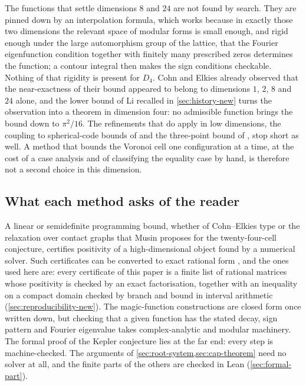 \documentclass[11pt,reqno]{amsart}
\renewcommand{\_}{\origunderscore\allowbreak}
\numberwithin{equation}{section}
\theoremstyle{plain}
\theoremstyle{definition}
\theoremstyle{remark}
\begin{document}
The functions that settle dimensions $8$ and $24$ are not found by search.
They are pinned down by an interpolation formula, which works because in
exactly those two dimensions the relevant space of modular forms is small
enough, and rigid enough under the large automorphism group of the lattice,
that the Fourier eigenfunction condition together with finitely many
prescribed zeros determines the function; a contour integral then makes the
sign conditions checkable. Nothing of that rigidity is present for $D_4$.
Cohn and Elkies \cite{CE03} already observed that the near-exactness of
their bound appeared to belong to dimensions $1$, $2$, $8$ and $24$ alone,
and the lower bound of Li recalled in \cref{sec:history-new} turns the
observation into a theorem in dimension four: no admissible function
brings the bound down to $\pi^2/16$. The refinements that do apply in low
dimensions, the coupling to spherical-code bounds of \cite{CZ14} and the
three-point bound of \cite{CdLS22}, stop short as well. A method that
bounds the Voronoi cell one configuration at a time, at the cost of a case
analysis and of classifying the equality case by hand, is therefore not a
second choice in this dimension.

\subsection{What each method asks of the reader}

A linear or semidefinite programming bound, whether of Cohn--Elkies type
or the relaxation over contact graphs that Musin \cite{Mus18} proposes for
the twenty-four-cell conjecture, certifies positivity of a
high-dimensional object found by a numerical solver. Such certificates can
be converted to exact rational form \cite{Par03,Las01,CdLL24}, and the ones
used here are: every certificate of this paper is a finite list of rational
matrices whose positivity is checked by an exact factorisation, together with
an inequality on a compact domain checked by branch and bound in interval
arithmetic (\cref{sec:reproducibility-new}). The magic-function constructions
are closed form once written down, but checking that a given function has the
stated decay, sign pattern and Fourier eigenvalue takes complex-analytic and
modular machinery. The formal proof of the Kepler conjecture \cite{Hal17}
lies at the far end: every step is machine-checked. The arguments of
\cref{sec:root-system,sec:cap-theorem} need no solver at all, and the finite
parts of the others are checked in Lean (\cref{sec:formal-part}).
\end{document}
